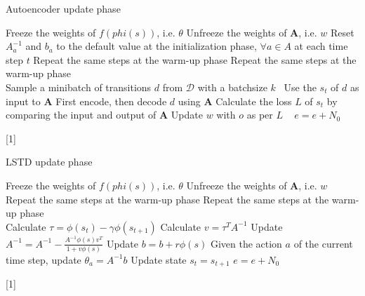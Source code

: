 \documentclass[a4paper,12pt,oneside]{article}
\numberwithin{equation}{section}
\begin{document}
    \clearpage
    \begin{algorithm}
    \caption{Autoencoder update phase}
        \begin{algorithmic}[1]
            \State Freeze the weights of \(f(phi(s))\), i.e. $\theta$
            \State Unfreeze the weights of $\mathbf{A}$, i.e. \(w\)
            \State Reset \(A_a^{-1}\) and \(b_a\) to the default value at the initialization phase, $\forall a \in A$ at each time step $t$
            \State Repeat the same steps at the warm-up phase
                \State Repeat the same steps at the warm-up phase
                \\
                \State Sample a minibatch of transitions \(d\) from $\mathcal{D}$ with a batchsize \(k\) \
                \State Use the \(s_t\) of \(d\) as input to $\mathbf{A}$
                \State First encode, then decode \(d\) using $\mathbf{A}$
                \State Calculate the loss \(L\) of \(s_t\) by comparing the input and output of $\mathbf{A}$
                \State Update \(w\) with \(o\) as per \(L\)
                \
            \EndFor
        \EndFor
        \State $e=e+N_0$
        \end{algorithmic}[1]
    \end{algorithm}

    \clearpage
    \begin{algorithm}
    \caption{LSTD update phase}
        \begin{algorithmic}[1]
            \State Freeze the weights of \(f(phi(s))\), i.e. $\theta$
            \State Unfreeze the weights of $\mathbf{A}$, i.e. \(w\)
        \For {\(episode\) \(e_0 = 1\) to \(N_0\)}
            \State Repeat the same steps at the warm-up phase
                \State Repeat the same steps at the warm-up phase
                \\
                \State Calculate $\tau = \phi(s_t) - \gamma \phi(s_{t+1})$
                \State Calculate $v = \tau^{T} A^{-1}$
                \State Update $A^{-1} = A^{-1} - \frac{A^{-1} \phi(s) v^{T}}{1 + v \phi(s)}$
                \State Update $b = b + r \phi(s)$
                \State Given the action $a$ of the current time step, update $\theta_a = A^{-1} b $
                \State Update state $s_t=s_{t+1}$
            \EndFor
        \EndFor
        \State $e=e+N_0$
        \end{algorithmic}[1]    
    \end{algorithm}
\end{document}
